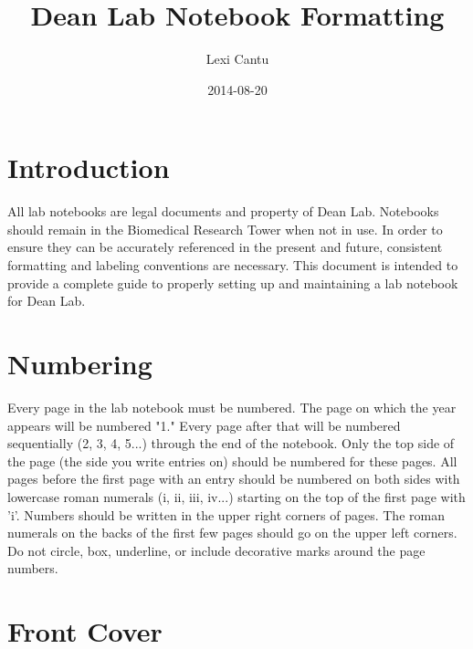 \documentclass[11pt, oneside]{article}   	%
\title{Dean Lab Notebook Formatting}
\author{Lexi Cantu}
\date{2014-08-20}					%
\begin{document}
\maketitle 							%

\tableofcontents{}					%

\newpage
\section*{Introduction}	
All lab notebooks are legal documents and property of Dean Lab. Notebooks should remain in the Biomedical Research Tower when not in use. In order to ensure they can be accurately referenced in the present and future, consistent formatting and labeling conventions are necessary. This document is intended to provide a complete guide to properly setting up and maintaining a lab notebook for Dean Lab.



\section{Numbering}

Every page in the lab notebook must be numbered. The page on which the year appears will be numbered "1." Every page after that will be numbered sequentially (2, 3, 4, 5...) through the end of the notebook. Only the top side of the page (the side you write entries on) should be numbered for these pages. All pages before the first page with an entry should be numbered on both sides with lowercase roman numerals (i, ii, iii, iv...) starting on the top of the first page with 'i'. Numbers should be written in the upper right corners of pages. The roman numerals on the backs of the first few pages should go on the upper left corners. Do not circle, box, underline, or include decorative marks around the page numbers. 


\section{Front Cover}					
\end{document}
